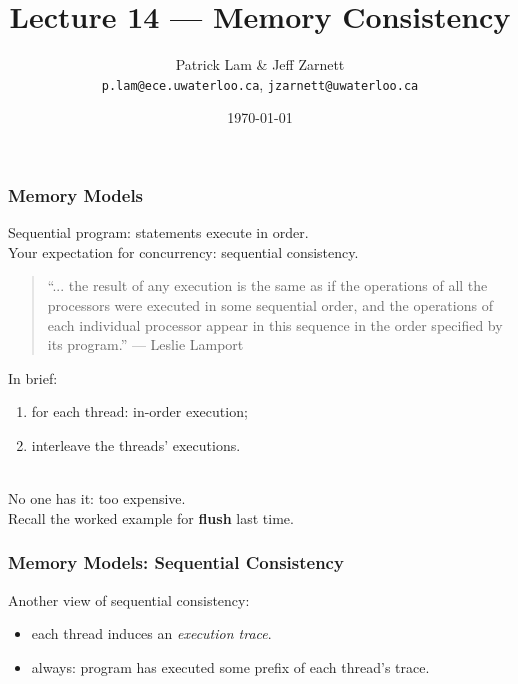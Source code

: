 

\title{Lecture 14 ---  Memory Consistency }

\author{Patrick Lam \& Jeff Zarnett\\ \small \texttt{p.lam@ece.uwaterloo.ca}, \texttt{jzarnett@uwaterloo.ca}}
\date{\today}




\begin{frame}
  \titlepage

 \end{frame}
\begin{frame}
  \frametitle{Memory Models}

  

  Sequential program: statements execute in order.\\

  Your expectation for concurrency: sequential consistency.

\begin{quote}
``... the result of any execution is the same as if the operations of all the processors were executed in some sequential order, and the operations of each individual processor appear in this sequence in the order specified by its program.'' --- Leslie Lamport
\end{quote}
  In brief:
  \begin{enumerate}
  \item for each thread: in-order execution;
  \item interleave the threads' executions.
  \end{enumerate}~\\

  No one has it: too expensive.\\
  Recall the worked example for {\bf flush} last time.\\[1em]

  

  
\end{frame}

\begin{frame}
  \frametitle{Memory Models: Sequential Consistency}

  
    Another view of sequential consistency:

    \begin{itemize}
      \item each thread induces an \emph{execution trace}.
      \item always: program has executed some prefix of each thread's
        trace.
    \end{itemize}
  
\end{frame}

